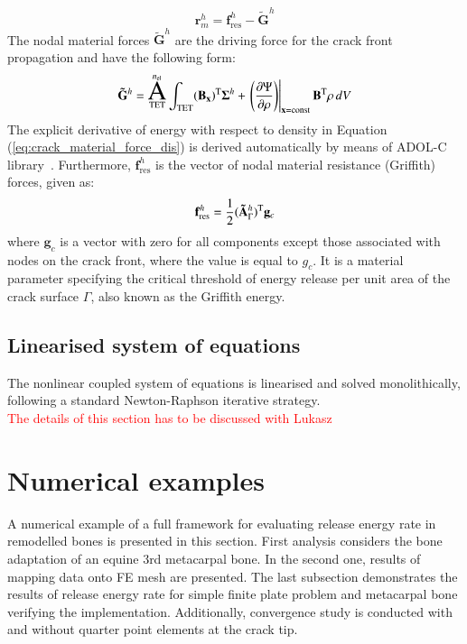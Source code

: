 \documentclass[11pt]{acmeArticle}
\DeclareMathOperator*{\aoperator}{ \text{\huge${\rm{A}}$}}
\numberwithin{equation}{section}
\begin{document}
\begin{equation}
\mathbf r_m^h = \mathbf f^h_{\text{res}} - \mathbf{\tilde G}^h
\end{equation}
The nodal material forces $\mathbf{\tilde G}^h$ are the driving force for the crack front propagation and have the following form:
\begin{equation}\label{eq:crack_material_force_dis}
\mathbf{\tilde G}^h = \aoperator_{\text{TET}}^{n_{\rm {el}}} \int_\text{TET} (\mathbf{B_x})^{\rm T} \mathbf \Sigma^h +   \left.\left( \frac{\partial \Psi}{\partial \rho} \right)\right|_{\mathbf{x}= \text {const}} \mathbf B^{\rm T} \rho \mathrm \,d V
\end{equation}
The explicit derivative of energy with respect to density in Equation (\ref{eq:crack_material_force_dis}) is derived automatically by means of ADOL-C library~\citep{Walther2009}. Furthermore, $\mathbf f^h_{\text {res}}$ is the vector of nodal material resistance (Griffith) forces, given as:
\begin{equation}
\mathbf f^h_{\text{res}} = \frac{1}{2} (\mathbf{\tilde A}^h_\Gamma)^{\rm T} \mathbf g_c
\end{equation}
where $ \mathbf g_c$ is a vector with zero for all components except those associated with nodes on the crack front, where the value is equal to $g_c$. It is a material parameter specifying the critical threshold of energy release per unit area of the crack surface $\Gamma$, also known as the Griffith energy.
\subsection{Linearised system of equations}
The nonlinear coupled system of equations is linearised and solved monolithically, following a standard Newton-Raphson iterative strategy. \\

\textcolor{red}{The details of this section has to be discussed with Lukasz}

\section{Numerical examples}
\label{sec:numerical_examples}
A numerical example of a full framework for evaluating release energy rate in remodelled bones is presented in this section. First analysis considers the bone adaptation of an equine 3rd metacarpal bone. In the second one, results of mapping data onto FE mesh are presented. The last subsection demonstrates the results of release energy rate for simple finite plate problem and metacarpal bone verifying the implementation. Additionally, convergence study is conducted with and without quarter point elements at the crack tip.
\end{document}
